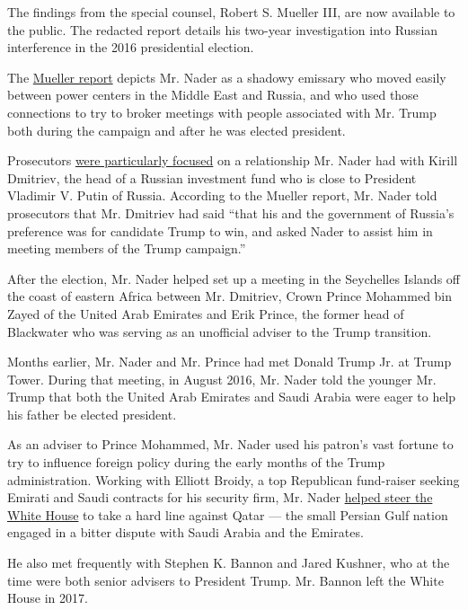 The findings from the special counsel, Robert S. Mueller III, are now
available to the public. The redacted report details his two-year
investigation into Russian interference in the 2016 presidential
election.

The
\href{https://www.nytimes.com/interactive/2019/04/18/us/politics/mueller-report-document.html}{Mueller
report} depicts Mr. Nader as a shadowy emissary who moved easily between
power centers in the Middle East and Russia, and who used those
connections to try to broker meetings with people associated with Mr.
Trump both during the campaign and after he was elected president.

Prosecutors
\href{https://www.nytimes.com/2018/04/04/us/politics/george-nader-russia-uae-special-counsel-investigation.html}{were
particularly focused} on a relationship Mr. Nader had with Kirill
Dmitriev, the head of a Russian investment fund who is close to
President Vladimir V. Putin of Russia. According to the Mueller report,
Mr. Nader told prosecutors that Mr. Dmitriev had said ``that his and the
government of Russia's preference was for candidate Trump to win, and
asked Nader to assist him in meeting members of the Trump campaign.''

After the election, Mr. Nader helped set up a meeting in the Seychelles
Islands off the coast of eastern Africa between Mr. Dmitriev, Crown
Prince Mohammed bin Zayed of the United Arab Emirates and Erik Prince,
the former head of Blackwater who was serving as an unofficial adviser
to the Trump transition.

Months earlier, Mr. Nader and Mr. Prince had met Donald Trump Jr. at
Trump Tower. During that meeting, in August 2016, Mr. Nader told the
younger Mr. Trump that both the United Arab Emirates and Saudi Arabia
were eager to help his father be elected president.

As an adviser to Prince Mohammed, Mr. Nader used his patron's vast
fortune to try to influence foreign policy during the early months of
the Trump administration. Working with Elliott Broidy, a top Republican
fund-raiser seeking Emirati and Saudi contracts for his security firm,
Mr. Nader
\href{https://www.nytimes.com/2018/03/21/us/politics/george-nader-elliott-broidy-uae-saudi-arabia-white-house-influence.html}{helped
steer the White House} to take a hard line against Qatar --- the small
Persian Gulf nation engaged in a bitter dispute with Saudi Arabia and
the Emirates.

He also met frequently with Stephen K. Bannon and Jared Kushner, who at
the time were both senior advisers to President Trump. Mr. Bannon left
the White House in 2017.

